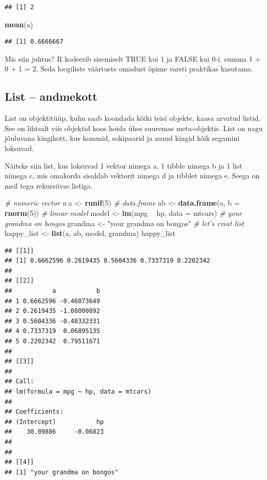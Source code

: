 \documentclass[]{book}
\newenvironment{Shaded}{\begin{snugshade}}{\end{snugshade}}
\newcommand{\KeywordTok}[1]{\textcolor[rgb]{0.13,0.29,0.53}{\textbf{#1}}}
\newcommand{\DataTypeTok}[1]{\textcolor[rgb]{0.13,0.29,0.53}{#1}}
\newcommand{\DecValTok}[1]{\textcolor[rgb]{0.00,0.00,0.81}{#1}}
\newcommand{\StringTok}[1]{\textcolor[rgb]{0.31,0.60,0.02}{#1}}
\newcommand{\CommentTok}[1]{\textcolor[rgb]{0.56,0.35,0.01}{\textit{#1}}}
\newcommand{\OperatorTok}[1]{\textcolor[rgb]{0.81,0.36,0.00}{\textbf{#1}}}
\newcommand{\NormalTok}[1]{#1}
\begin{document}
\begin{verbatim}
## [1] 2
\end{verbatim}

\begin{Shaded}
\begin{Highlighting}[]
\KeywordTok{mean}\NormalTok{(a)}
\end{Highlighting}
\end{Shaded}

\begin{verbatim}
## [1] 0.6666667
\end{verbatim}

Mis siin juhtus? R kodeerib sisemiselt TRUE kui 1 ja FALSE kui 0-i.
summa 1 + 0 + 1 = 2. Seda loogiliste väärtuste omadust õpime varsti
praktikas kasutama.

\subsection{List -- andmekott}\label{list-andmekott}

List on objektitüüp, kuhu saab koondada kõiki teisi objekte, kaasa
arvatud listid. See on lihtsalt viis objektid koos hoida ühes suuremas
meta-objektis. List on nagu jõuluvana kingikott, kus kommid, sokipaarid
ja muud kingid kõik segamini loksuvad.

Näiteks siin list, kus loksuvad 1 vektor nimega a, 1 tibble nimega b ja
1 list nimega c, mis omakorda sisaldab vektorit nimega d ja tibblet
nimega e. Seega on meil tegu rekursiivse listiga.

\begin{Shaded}
\begin{Highlighting}[]
\CommentTok{# numeric vector a}
\NormalTok{a <-}\StringTok{ }\KeywordTok{runif}\NormalTok{(}\DecValTok{5}\NormalTok{)}
\CommentTok{# data.frame}
\NormalTok{ab <-}\StringTok{ }\KeywordTok{data.frame}\NormalTok{(a, }\DataTypeTok{b =} \KeywordTok{rnorm}\NormalTok{(}\DecValTok{5}\NormalTok{))}
\CommentTok{# linear model}
\NormalTok{model <-}\StringTok{ }\KeywordTok{lm}\NormalTok{(mpg }\OperatorTok{~}\StringTok{ }\NormalTok{hp, }\DataTypeTok{data =}\NormalTok{ mtcars)}
\CommentTok{# your grandma on bongos}
\NormalTok{grandma <-}\StringTok{ "your grandma on bongos"}
\CommentTok{# let's creat list}
\NormalTok{happy_list <-}\StringTok{ }\KeywordTok{list}\NormalTok{(a, ab, model, grandma)}
\NormalTok{happy_list}
\end{Highlighting}
\end{Shaded}

\begin{verbatim}
## [[1]]
## [1] 0.6662596 0.2619435 0.5604336 0.7337319 0.2202342
## 
## [[2]]
##           a           b
## 1 0.6662596 -0.46073649
## 2 0.2619435 -1.08000892
## 3 0.5604336 -0.48332331
## 4 0.7337319  0.06895135
## 5 0.2202342  0.79511671
## 
## [[3]]
## 
## Call:
## lm(formula = mpg ~ hp, data = mtcars)
## 
## Coefficients:
## (Intercept)           hp  
##    30.09886     -0.06823  
## 
## 
## [[4]]
## [1] "your grandma on bongos"
\end{verbatim}
\end{document}
